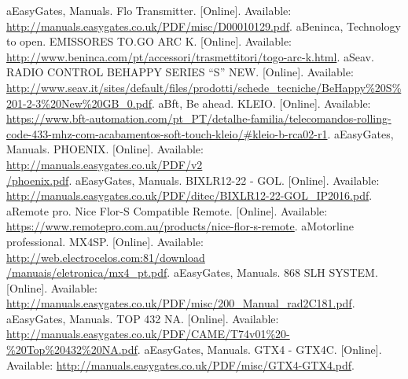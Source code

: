 \begin{thebibliography}{1}
	\bibitem aEasyGates, Manuals. Flo Transmitter. [Online]. Available: \href{http://manuals.easygates.co.uk/PDF/misc/D00010129.pdf}{http://manuals.easygates.co.uk/PDF/misc/D00010129.pdf}.
	\bibitem aBeninca, Technology to open. EMISSORES TO.GO ARC K. [Online]. Available: \href{http://www.beninca.com/pt/accessori/trasmettitori/togo-arc-k.html}{http://www.beninca.com/pt/accessori/trasmettitori/togo-arc-k.html}.
	\bibitem aSeav. RADIO CONTROL  BEHAPPY SERIES ``S'' NEW. [Online]. Available: \href{http://www.seav.it/sites/default/files/prodotti/schede_tecniche/BeHappy\%20S\%201-2-3\%20New\%20GB_0.pdf}{http://www.seav.it/sites/default/files/prodotti/schede\_tecniche/BeHappy\%20S\%201-2-3\%20New\%20GB\_0.pdf}.
	\bibitem aBft, Be ahead. KLEIO. [Online]. Available: \href{https://www.bft-automation.com/pt_PT/detalhe-familia/telecomandos-rolling-code-433-mhz-com-acabamentos-soft-touch-kleio/\#kleio-b-rca02-r1}{https://www.bft-automation.com/pt\_PT/detalhe-familia/telecomandos-rolling-code-433-mhz-com-acabamentos-soft-touch-kleio/\#kleio-b-rca02-r1}.
	\bibitem aEasyGates, Manuals. PHOENIX. [Online]. Available: \href{http://manuals.easygates.co.uk/PDF/v2/phoenix.pdf}{http://manuals.easygates.co.uk/PDF/v2\\/phoenix.pdf}.
	\bibitem aEasyGates, Manuals. BIXLR12-22 - GOL. [Online]. Available: \href{http://manuals.easygates.co.uk/PDF/ditec/BIXLR12-22-GOL_IP2016.pdf}{http://manuals.easygates.co.uk/PDF/ditec/BIXLR12-22-GOL\_IP2016.pdf}.
	\bibitem aRemote pro. Nice Flor-S Compatible Remote. [Online]. Available: \href{https://www.remotepro.com.au/products/nice-flor-s-remote}{https://www.remotepro.com.au/products/nice-flor-s-remote}.
	\bibitem aMotorline professional. MX4SP. [Online]. Available: \href{http://web.electrocelos.com:81/download/manuais/eletronica/mx4_pt.pdf}{http://web.electrocelos.com:81/download\\/manuais/eletronica/mx4\_pt.pdf}.
	\bibitem aEasyGates, Manuals. 868 SLH SYSTEM. [Online]. Available: \href{http://manuals.easygates.co.uk/PDF/misc/200_Manual_rad2C181.pdf}{http://manuals.easygates.co.uk/PDF/misc/200\_Manual\_rad2C181.pdf}.
	\bibitem aEasyGates, Manuals. TOP 432 NA. [Online]. Available: \href{http://manuals.easygates.co.uk/PDF/CAME/T74v01\%20-\%20Top\%20432\%20NA.pdf}{http://manuals.easygates.co.uk/PDF/CAME/T74v01\%20-\%20Top\%20432\%20NA.pdf}.
	\bibitem aEasyGates, Manuals. GTX4 - GTX4C. [Online]. Available: \href{http://manuals.easygates.co.uk/PDF/misc/GTX4-GTX4.pdf}{http://manuals.easygates.co.uk/PDF/misc/GTX4-GTX4.pdf}.
	

\end{thebibliography}
